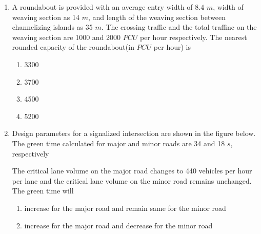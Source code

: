 \documentclass[journal]{IEEEtran}
\begin{document}
\begin{enumerate}
	\item A roundabout is provided with an average entry width of $8.4$ $m$, width of weaving section as 14 $m$, and length of the weaving section between channelizing islands as 35 $m$. The crossing traffic and the total traffinc on the weaving section are 1000 and 2000 $PCU$ per hour respectively. The nearest rounded capacity of the roundabout(in $PCU$ per hour) is
\begin{multicols}{2}
	\begin{enumerate}
		\item 3300
		\item 3700
		\item 4500
		\item 5200
	\end{enumerate}
\end{multicols}	
	\item Design parameters for a signalized intersection are shown in the figure below. The green time calculated for major and minor roads are 34 and 18 $s$, respectively
\begin{figure}[h]
\centering
{}
\end{figure}

		The critical lane volume on the major road changes to 440 vehicles per hour per lane and the critical lane volume on the minor road remains unchanged. The green time will
\begin{multicols}{2}
	\begin{enumerate}
		\item increase for the major road and remain same for the minor road
		\item increase for the major road and decrease for the minor road


\end{enumerate}
\end{multicols}
\end{enumerate}
\end{document}
